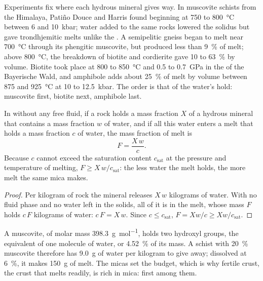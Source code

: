 Experiments fix where each hydrous mineral gives way. In muscovite schists from the
Himalaya, Patiño Douce and Harris found  beginning at 750 to
\qty{800}{\celsius} between 6 and \qty{10}{kbar}; water added to the same rocks lowered the
solidus but gave trondhjemitic melts unlike the . A semipelitic gneiss
began to melt near \qty{700}{\celsius} through its phengitic muscovite, but produced less
than \qty{9}{\percent} of melt; above \qty{800}{\celsius}, the breakdown of biotite and
cordierite gave 10 to \qty{63}{\percent} by volume. Biotite  took place
at 800 to \qty{850}{\celsius} and 0.5 to \qty{0.7}{GPa} in the  of the
Bayerische Wald, and amphibole adds about \qty{25}{\percent} of melt by volume between 875
and \qty{925}{\celsius} at 10 to \qty{12.5}{kbar}. The order is that of the water's hold:
muscovite first, biotite next, amphibole last.

\begin{proposition}\label{prop:b2:crustal-melting:water}
In  without any free fluid, if a rock holds a mass fraction $X$ of a
hydrous mineral that contains a mass fraction $w$ of water, and if all this water enters a
melt that holds a mass fraction $c$ of water, the mass fraction of melt is
\[F = \frac{X\,w}{c}.\]
Because $c$ cannot exceed the saturation content $c_{\mathrm{sat}}$ at the pressure and
temperature of melting, $F \ge X\,w/c_{\mathrm{sat}}$: the less water the melt holds, the
more melt the same mica makes.
\end{proposition}

\begin{proof}
Per kilogram of rock the mineral releases $X\,w$ kilograms of water. With no fluid phase
and no water left in the solids, all of it is in the melt, whose mass $F$ holds $c\,F$
kilograms of water: $c\,F = X\,w$. Since $c \le c_{\mathrm{sat}}$, $F = Xw/c \ge
Xw/c_{\mathrm{sat}}$.
\end{proof}

A muscovite,  of molar mass \qty{398.3}{\gram\per\mole}, holds two
hydroxyl groups, the equivalent of one molecule of water, or \qty{4.52}{\percent} of its
mass. A schist with \qty{20}{\percent} muscovite therefore has \qty{9.0}{\gram} of water
per kilogram to give away; dissolved at \qty{6}{\percent}, it makes \qty{150}{\gram} of
melt. The micas set the budget, which is why fertile crust, the crust that melts readily,
is rich in mica:  first among them.

